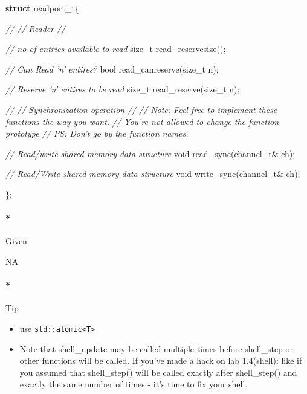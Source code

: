 \documentclass[]{article}
\newenvironment{Shaded}{}{}
\newcommand{\KeywordTok}[1]{\textbf{{#1}}}
\newcommand{\DataTypeTok}[1]{\textcolor[rgb]{0.50,0.00,0.00}{{#1}}}
\newcommand{\CommentTok}[1]{\textcolor[rgb]{0.50,0.50,0.50}{\textit{{#1}}}}
\newcommand{\NormalTok}[1]{{#1}}
\providecommand{\tightlist}{%
  \setlength{\itemsep}{0pt}\setlength{\parskip}{0pt}}
\let\oldparagraph\paragraph
\renewcommand{\paragraph}[1]{\oldparagraph{#1}\mbox{}}
\begin{document}
\begin{Shaded}
\begin{Highlighting}[]

\KeywordTok{struct} \NormalTok{readport_t\{}


  \CommentTok{//}
  \CommentTok{// Reader}
  \CommentTok{//}


  \CommentTok{// no of entries available to read}
  \DataTypeTok{size_t} \NormalTok{read_reservesize();}

  \CommentTok{// Can Read 'n' entires?}
  \NormalTok{bool read_canreserve(}\DataTypeTok{size_t} \NormalTok{n);}

  \CommentTok{// Reserve 'n' entires to be read}
  \DataTypeTok{size_t} \NormalTok{read_reserve(}\DataTypeTok{size_t} \NormalTok{n);}



  \CommentTok{//}
  \CommentTok{// Synchronization operation}
  \CommentTok{//}
  \CommentTok{// Note: Feel free to implement these functions the way you want.}
  \CommentTok{//       You're not allowed to change the function prototype}
  \CommentTok{// PS:   Don't go by the function names.}

  \CommentTok{// Read/write shared memory data structure}
  \DataTypeTok{void} \NormalTok{read_sync(channel_t& ch);}

  \CommentTok{// Read/Write shared memory data structure}
  \DataTypeTok{void} \NormalTok{write_sync(channel_t& ch);}

\NormalTok{\};}
\end{Highlighting}
\end{Shaded}

\paragraph*{Given}\label{given-8}

NA

\paragraph*{Tip}\label{tip-8}

\begin{itemize}
\tightlist
\item
  use \texttt{std::atomic\textless{}T\textgreater{}}
\item
  Note that shell\_update may be called multiple times before
  shell\_step or other functions will be called. If you've made a hack
  on lab 1.4(shell): like if you assumed that shell\_step() will be
  called exactly after shell\_step() and exactly the same number of
  times - it's time to fix your shell.
\end{itemize}
\end{document}
